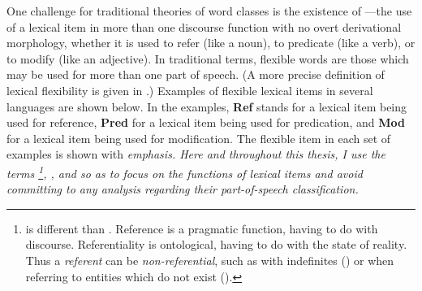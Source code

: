 One challenge for traditional theories of word classes is the existence of —the use of a lexical item in more than one discourse function with no overt derivational morphology, whether it is used to refer (like a noun), to predicate (like a verb), or to modify (like an adjective). In traditional terms, flexible words are those which may be used for more than one part of speech. (A more precise definition of lexical flexibility is given in .) Examples of flexible lexical items in several languages are shown below. In the examples, \textbf{Ref} stands for a lexical item being used for reference, \textbf{Pred} for a lexical item being used for predication, and \textbf{Mod} for a lexical item being used for modification. The flexible item in each set of examples is shown with \em{emphasis}. Here and throughout this thesis, I use the terms \footnote{ is different than . Reference is a pragmatic function, having to do with discourse. Referentiality is ontological, having to do with the state of reality. Thus a \emph{referent} can be \emph{non-referential}, such as with indefinites () or when referring to entities which do not exist ().}, , and  so as to focus on the functions of lexical items and avoid committing to any analysis regarding their part-of-speech classification.

